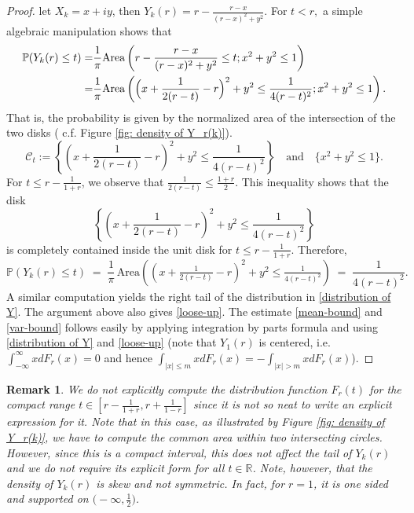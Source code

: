 \documentclass[9pt,a4paper,reqno]{amsart}
\theoremstyle{mine}
\newtheorem{remark}[thm]{Remark}
\theoremstyle{definition}
\theoremstyle{remark}
\newcommand{\mb}{\mathbb}
\begin{document}
\begin{proof}
    let $X_k= x+iy$, then $Y_k(r)=r-\frac{r-x}{(r-x)^2+y^2}$. For $t<r,$ a simple algebraic manipulation shows that
    \begin{align*}
        \mb{P}(Y_k(r)\leq t) =& \frac{1}{\pi} \mbox{Area}\left(r-\frac{r-x}{(r-x)^2+y^2} \leq t ; x^2+y^2 \leq 1 \right) \\
        =&  \frac{1}{\pi} \mbox{Area}\left( \Bigl(x+\frac{1}{2(r-t)}-r \Bigr)^2 +y^2 \leq \frac{1}{4(r-t)^2} ; x^2+y^2 \leq 1 \right). 
    \end{align*}
    That is, the probability is given by the normalized area of the intersection of the two disks ( c.f. Figure \ref{fig: density of Y_r(k)}).
\[
\mathcal{C}_t:=\left\{ \left(x + \frac{1}{2(r-t)} - r\right)^{2} + y^{2} \leq \frac{1}{4(r-t)^{2}} \right\} 
\quad \text{and} \quad 
\{x^{2}+y^{2} \leq 1\}.
\]  
For $t \leq r - \tfrac{1}{1+r}$, we observe that $\frac{1}{2(r-t)} \leq \frac{1+r}{2}$.  
This inequality shows that the disk 
\[
\left\{ \left(x + \frac{1}{2(r-t)} - r\right)^{2} + y^{2} \leq \frac{1}{4(r-t)^{2}} \right\} 
\]  
is completely contained inside the unit disk for $t \leq r - \tfrac{1}{1+r}$. Therefore,  
\[
\mb{P}(Y_k(r) \leq t) \;=\; \frac{1}{\pi} \, \mathrm{Area}\!\left( \left(x + \tfrac{1}{2(r-t)} - r\right)^{2} + y^{2} \leq \tfrac{1}{4(r-t)^{2}} \right) 
\;=\; \frac{1}{4(r-t)^{2}}.
\]
A similar computation yields the right tail of the distribution in \eqref{distribution of Y}. The argument above also gives \eqref{loose-up}. The estimate \eqref{mean-bound} and \eqref{var-bound} follows easily by applying integration by parts formula and using \eqref{distribution of Y} and \eqref{loose-up} (note that $Y_1(r)$ is centered, i.e. $\int_{-\infty}^{\infty} xdF_r(x) =0$ and hence $\int_{|x|\leq m }xdF_r(x)= - \int_{|x| > m }xdF_r(x)$). 
\end{proof}


\begin{remark}\label{remark-on-tail}
    We do not explicitly compute the distribution function $F_r(t)$ for the compact range $t \in [r- \frac{1}{1+r}, r + \frac{1}{1-r}]$ since it is not so neat to write an explicit expression for it. Note that in this case, as illustrated by Figure \ref{fig: density of Y_r(k)}, we have to compute the common area within two intersecting circles. However, since this is a compact interval, this does not affect the tail of $Y_k(r)$ and we do not require its explicit form for all $t\in \mb{R}$. Note, however, that the density of $Y_k(r)$ is skew and not symmetric. In fact, for $r=1$, it is one sided and supported on $\bigl(-\infty,\frac{1}{2}\bigr)$.  
\end{remark}
\end{document}
